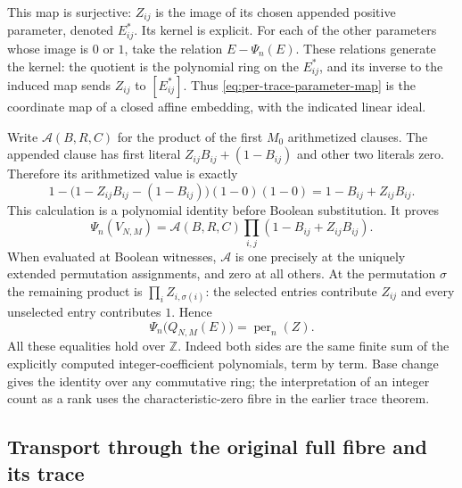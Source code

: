This map is surjective: $Z_{ij}$ is the image of its chosen appended
positive parameter, denoted $E^*_{ij}$. Its kernel is explicit.
For each of the other parameters whose image is $0$ or $1$, take
the relation $E-\Psi_n(E)$. These relations generate the kernel:
the quotient is the polynomial ring on the $E^*_{ij}$, and its
inverse to the induced map sends $Z_{ij}$ to $[E^*_{ij}]$.
Thus \eqref{eq:per-trace-parameter-map} is the coordinate map of a
closed affine embedding, with the indicated linear ideal.

Write $\mathcal A(B,R,C)$ for the product of the first $M_0$
arithmetized clauses. The appended clause has first literal
$Z_{ij}B_{ij}+(1-B_{ij})$ and other two literals zero. Therefore
its arithmetized value is exactly
\[
 1-\bigl(1-Z_{ij}B_{ij}-(1-B_{ij})\bigr)(1-0)(1-0)
       =1-B_{ij}+Z_{ij}B_{ij}.
\]
This calculation is a polynomial identity before Boolean substitution.
It proves
\[
 \Psi_n(V_{N,M})=
 \mathcal A(B,R,C)\prod_{i,j}(1-B_{ij}+Z_{ij}B_{ij}).
\]
When evaluated at Boolean witnesses, $\mathcal A$ is one precisely
at the uniquely extended permutation assignments, and zero at all
others. At the permutation $\sigma$ the remaining product is
$\prod_i Z_{i,\sigma(i)}$: the selected entries contribute $Z_{ij}$
and every unselected entry contributes $1$. Hence
\begin{equation}\label{eq:per-trace-projection}
 \Psi_n\bigl(Q_{N,M}(E)\bigr)=\operatorname{per}_n(Z).
\end{equation}
All these equalities hold over $\mathbb Z$. Indeed both sides are
the same finite sum of the explicitly computed integer-coefficient
polynomials, term by term. Base change gives the identity over any
commutative ring; the interpretation of an integer count as a rank
uses the characteristic-zero fibre in the earlier trace theorem.

\subsection{Transport through the original full fibre and its trace}

